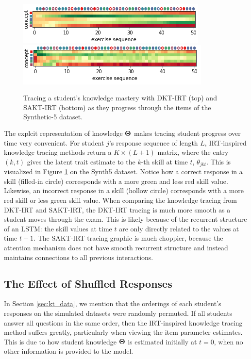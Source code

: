 \begin{figure}[h]
  \centering
  \includegraphics[width=.7\textwidth]{img/kt_irt/knowledge_trace_lstm_edited.png}\\
  \vspace{.5cm}
  \includegraphics[width=.7\textwidth]{img/kt_irt/knowledge_trace_attn_edited.png}
  \caption{Tracing a student's knowledge mastery with DKT-IRT (top) and SAKT-IRT (bottom) as they progress through the items of the Synthetic-5 dataset.}
  \label{fig:synth5_trace}
\end{figure}

The explcit representation of knowledge $\boldsymbol{\Theta}$ makes tracing student progress over time very convenient. For student $j$'s response sequence of length $L$, IRT-inspired knowledge tracing methods return a $K \times (L+1)$ matrix, where the entry $(k,t)$ gives the latent trait estimate to the $k$-th skill at time $t$, $\theta_{jkt}$. This is visualized in Figure \ref{fig:synth5_trace} on the Synth5 dataset. Notice how a correct response in a skill (filled-in circle) corresponds with a more green and less red skill value. Likewise, an incorrect response in a skill (hollow circle) corresponds with a more red skill or less green skill value. When comparing the knowledge tracing from DKT-IRT and SAKT-IRT, the DKT-IRT tracing is much more smooth as a student moves through the exam. This is likely because of the recurrent structure of an LSTM: the skill values at time $t$ are only directly related to the values at time $t-1$. The SAKT-IRT tracing graphic is much choppier, because the attention mechanism does not have smooth recurrent structure and instead maintains connections to all previous interactions.

\subsection{The Effect of Shuffled Responses}\label{sec:shuffle}
In Section \ref{sec:kt_data}, we mention that the orderings of each student's responses on the simulated datasets were randomly permuted. If all students answer all questions in the same order, then the IRT-inspired knowledge tracing method suffers greatly, particularly when viewing the item parameter estimates. This is due to how student knowledge $\boldsymbol{\Theta}$ is estimated initially at $t=0$, when no other information is provided to the model.


